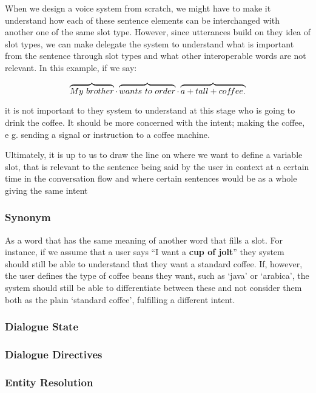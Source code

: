 	When we design a voice system from scratch, we might have to make it understand how each of these sentence elements can be interchanged with another one of the same slot type. However, since utterances build on they idea of slot types, we can make delegate the system to understand what is important from the sentence through slot types and what other interoperable words are not relevant. In this example, if we say:
	
	\[
	\overbrace{My \ brother} \cdot
	\overbrace{wants \ to \ order} \cdot
	\overbrace{ a + tall + cof\mkern-3mu fee.}
	\]
	

	it is not important to they system to understand at this stage who is going to drink the coffee. It should be more concerned with the intent; making the coffee, e g. sending a signal or instruction to a coffee machine.
	 
	Ultimately, it is up to us to draw the line on where we want to define a variable slot, that is relevant to the sentence being said by the user in context at a certain time in the conversation flow and where certain sentences would be as a whole giving the same intent
	
	
	\subsubsection*{Synonym}
	As a word that has the same meaning of another word that fills a slot. For instance, if we assume that a user says ``I want a \textbf{cup of jolt}'' they system should still be able to understand that they want a standard coffee. If, however, the user defines the type of coffee beans they want, such as `java' or `arabica', the system should still be able to differentiate between these and not consider them both as the plain `standard coffee', fulfilling a different intent. 
	
	\subsubsection*{Dialogue State}
	
	\subsubsection*{Dialogue Directives}
	
	\subsubsection*{Entity Resolution}	
	
